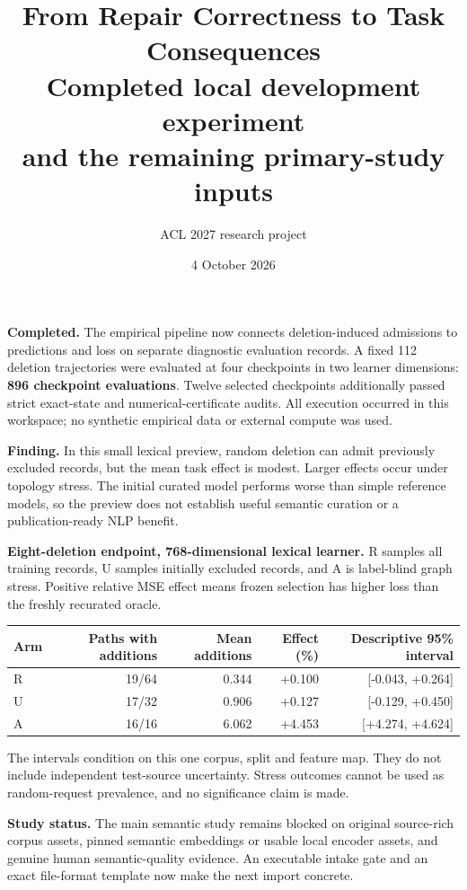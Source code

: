 \documentclass[11pt,a4paper]{article}
\title{\color{ink}\textbf{From Repair Correctness to Task Consequences}\\[5pt]
\Large Completed local development experiment\\and the remaining primary-study inputs}
\author{ACL 2027 research project}\date{4 October 2026}
\begin{document}
\maketitle

\textbf{Completed.} The empirical pipeline now connects deletion-induced
admissions to predictions and loss on separate diagnostic evaluation records.
A fixed 112 deletion trajectories were evaluated at four checkpoints in two
learner dimensions: \textbf{896 checkpoint evaluations}. Twelve selected
checkpoints additionally passed strict exact-state and numerical-certificate
audits. All execution occurred in this workspace; no synthetic empirical data
or external compute was used.

\textbf{Finding.} In this small lexical preview, random deletion can admit
previously excluded records, but the mean task effect is modest. Larger effects
occur under topology stress. The initial curated model performs worse than
simple reference models, so the preview does not establish useful semantic
curation or a publication-ready NLP benefit.

\textbf{Eight-deletion endpoint, 768-dimensional lexical learner.}
R samples all training records, U samples initially excluded records, and A
is label-blind graph stress. Positive relative MSE effect means frozen selection
has higher loss than the freshly recurated oracle.
\begin{center}\small
\begin{tabular}{lrrrr}\toprule
Arm & Paths with additions & Mean additions & Effect (\%) & Descriptive 95\% interval\\\midrule
R & 19/64 & 0.344 & +0.100 & [-0.043, +0.264] \\
U & 17/32 & 0.906 & +0.127 & [-0.129, +0.450] \\
A & 16/16 & 6.062 & +4.453 & [+4.274, +4.624] \\
\bottomrule\end{tabular}\end{center}
The intervals condition on this one corpus, split and feature map. They do not
include independent test-source uncertainty. Stress outcomes cannot be used
as random-request prevalence, and no significance claim is made.

\textbf{Study status.} The main semantic study remains blocked on original
source-rich corpus assets, pinned semantic embeddings or usable local encoder
assets, and genuine human semantic-quality evidence. An executable intake
gate and an exact file-format template now make the next import concrete.
\newpage
\end{document}
